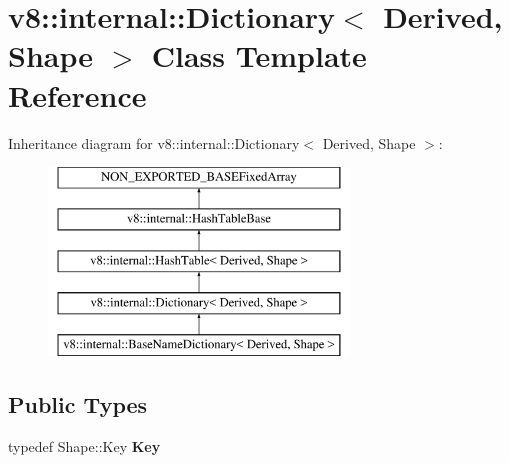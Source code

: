 \hypertarget{classv8_1_1internal_1_1Dictionary}{}\section{v8\+:\+:internal\+:\+:Dictionary$<$ Derived, Shape $>$ Class Template Reference}
\label{classv8_1_1internal_1_1Dictionary}
Inheritance diagram for v8\+:\+:internal\+:\+:Dictionary$<$ Derived, Shape $>$\+:\begin{figure}[H]
\begin{center}
\leavevmode
\includegraphics[height=5.000000cm]{classv8_1_1internal_1_1Dictionary}
\end{center}
\end{figure}
\subsection*{Public Types}
\begin{DoxyCompactItemize}
\item 
\mbox{\label{classv8_1_1internal_1_1Dictionary_a23915ac04f8f7ff0133b6cbb550f563c}} 
typedef Shape\+::\+Key {\bfseries Key}
\end{DoxyCompactItemize}
